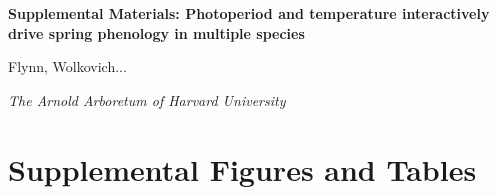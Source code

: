 \documentclass{article}
\begin{document}


\flushleft

\textbf{\large{Supplemental Materials: Photoperiod and temperature interactively drive spring phenology in multiple species}}

Flynn, Wolkovich...

\textit{The Arnold Arboretum of Harvard University}

\renewcommand{\thetable}{S\arabic{table}}
\renewcommand{\thefigure}{S\arabic{figure}}

\section*{Supplemental Figures and Tables}
\end{document}
